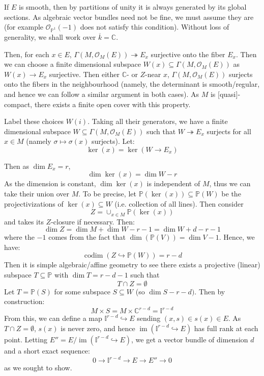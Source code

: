 \documentclass{ut-thesis}
\newenvironment{Proof}[1][]
  {\begin{ProofTcb}[#1]}
  {\end{ProofTcb}}
\newcommand{\BI}{{\mathbb{I}}}
\newcommand{\C}{{\mathbb{C}}}
\renewcommand{\P}{{\mathbb{P}}}
\newcommand{\CO}{{\mathcal{O}}}
\newcommand{\sse}{\subseteq}
\newcommand{\im}{{\operatorname{im}}}
\newcommand{\codim}{{\operatorname{codim}}}
\begin{document}
\begin{Proof}
  If $E$ is smooth, then by partitions of unity it is always generated by its global sections. As algebraic
  vector bundles need not be fine, we must assume they are (for example $\CO_{\P^1}(-1)$ does not satisfy this
  condition). Without loss of generality, we shall work over $\overline{k} = \C$.

  Then, for each $x \in E$, $\Gamma(M, \CO_M(E)) \twoheadrightarrow E_x$ surjective onto the fiber $E_x$. Then
  we can choose a finite dimensional subspace $W(x) \sse \Gamma(M, \CO_M(E))$ as $W(x) \to E_x$ surjective. Then
  either $\C$- or $Z$-near $x$, $\Gamma(M, \CO_M(E))$ surjects onto the fibers in the neighbourhood (namely,
  the determinant is smooth/regular, and hence we can follow a similar argument in both cases). As $M$ is
  [quasi]-compact, there exists a finite open cover with this property.

  Label these choices $W(i)$. Taking all their generators, we have a finite dimensional subspace $W \sse
  \Gamma(M, \CO_M(E))$ such that $W \twoheadrightarrow E_x$ surjects for all $ x\in M$ (namely $\sigma \mapsto
  \sigma(x)$ surjects). Let:
  \[
    \ker(x) = \ker(W \to E_x)
  \]

  Then as $\dim E_x = r$,
  \[
    \dim \ker(x) = \dim W - r
  \]
  As the dimension is constant, $\dim\ker(x)$ is independent of $M$, thus we can take their union over $M$. To
  be precise, let $\P(\ker(x))\sse \P(W)$ be the projectivizations of $\ker(x) \sse W$ (i.e. collection of all
  lines). Then consider
  \[
    Z = \cup_{x \in M} \P(\ker(x))
  \]
  and takes its $Z$-closure if necessary. Then:
  \[
    \dim Z = \dim M + \dim W - r-1 = \dim W  + d-r-1
  \]
  where the $-1$ comes from the fact that $\dim(\P(V))  = \dim V - 1$. Hence, we have:
  \[
    \codim(Z \hookrightarrow \P(W)) = r-d
  \]
  Then it is simple algebraic/affine geometry to see there exists a projective (linear) subspace $T \sse \P$ with $\dim
  T = r-d-1$ such that
  \[
    T\cap Z = \emptyset
  \]
  Let $T = \P(S)$ for some subspace $S \sse W$ (so $\dim S - r-d)$. Then by construction:
  \[
    M\times S = M \times \C^{r-d} = \BI^{r-d}
  \]
  From this, we can define a map $\BI^{r-d} \hookrightarrow E$ sending $(x,s) \in s(x) \in E$. As $T\cap
  Z  = \emptyset$, $s(x)$ is never zero, and hence $\im(\BI^{r-d} \hookrightarrow E)$ has full rank at each
  point. Letting $E'' = E/\im(\BI^{r-d} \hookrightarrow E)$, we get a vector bundle of dimension $d$
  and a short exact sequence:
  \[
    0 \to \BI^{r-d} \to E \to E'' \to 0
  \]
  as we sought to show.
\end{Proof}
\end{document}
